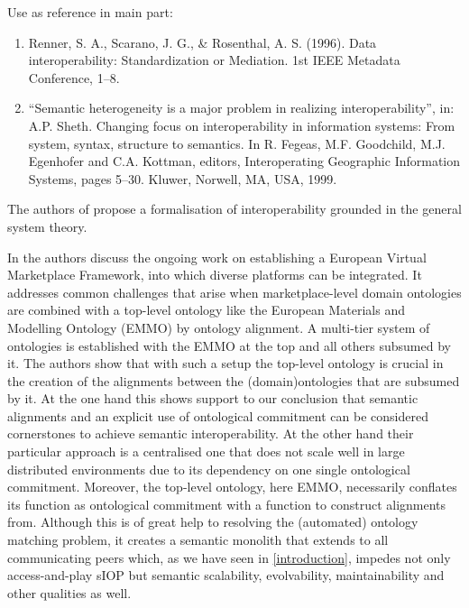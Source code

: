 \documentclass[sort&compress,preprint,authoryear,3p,twocolumn]{elsarticle}
\providecommand{\tightlist}{%
  \setlength{\itemsep}{0pt}\setlength{\parskip}{0pt}}
\begin{document}
Use as reference in main part:

\begin{enumerate}
\def\labelenumi{\arabic{enumi}.}
\tightlist
\item
  Renner, S. A., Scarano, J. G., \& Rosenthal, A. S. (1996). Data
  interoperability: Standardization or Mediation. 1st IEEE Metadata
  Conference, 1--8.
\item
  ``Semantic heterogeneity is a major problem in realizing
  interoperability'', in: A.P. Sheth. Changing focus on interoperability
  in information systems: From system, syntax, structure to semantics.
  In R. Fegeas, M.F. Goodchild, M.J. Egenhofer and C.A. Kottman,
  editors, Interoperating Geographic Information Systems, pages 5--30.
  Kluwer, Norwell, MA, USA, 1999.
\end{enumerate}

The authors of \cite{Naudet2010} propose a formalisation of
interoperability grounded in the general system theory.

In \citep{Horsch2020} the authors discuss the ongoing work on
establishing a European Virtual Marketplace Framework, into which
diverse platforms can be integrated. It addresses common challenges that
arise when marketplace-level domain ontologies are combined with a
top-level ontology like the European Materials and Modelling Ontology
(EMMO) by ontology alignment. A multi-tier system of ontologies is
established with the EMMO at the top and all others subsumed by it. The
authors show that with such a setup the top-level ontology is crucial in
the creation of the alignments between the (domain)ontologies that are
subsumed by it. At the one hand this shows support to our conclusion
that semantic alignments and an explicit use of ontological commitment
can be considered cornerstones to achieve semantic interoperability. At
the other hand their particular approach is a centralised one that does
not scale well in large distributed environments due to its dependency
on one single ontological commitment. Moreover, the top-level ontology,
here EMMO, necessarily conflates its function as ontological commitment
with a function to construct alignments from. Although this is of great
help to resolving the (automated) ontology matching problem, it creates
a semantic monolith that extends to all communicating peers which, as we
have seen in \cref{introduction}, impedes not only access-and-play sIOP
but semantic scalability, evolvability, maintainability and other
qualities as well.
\end{document}
